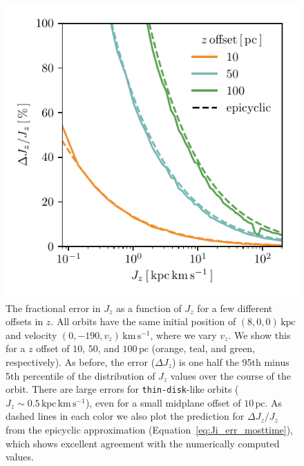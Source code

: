 \documentclass[twocolumn]{aastex62}
\newcommand{\pc}{\text{pc}}
\newcommand{\kpc}{\text{kpc}}
\newcommand{\kms}{\text{km}\,\text{s}^{-1}}
\newcommand{\actunit}{\text{kpc}\,\kms}
\newcommand{\thin}{\texttt{thin-disk}}
\begin{document}
\begin{figure}
\begin{center}
\includegraphics[width=\columnwidth]{fig/schmactions_many_orbits_Jz_fun.pdf}
\end{center}
\caption{The fractional error in $J_z$ as a function of $J_z$ for a few
different offsets in $z$. All orbits have the same initial position of $(8, 0,
0)\,\kpc$ and velocity $(0, -190, v_z)\,\kms$, where we vary $v_z$. We show
this for a $z$ offset of $10$, $50$, and $100\,\pc$ (orange, teal, and green,
respectively). As before, the error ($\Delta J_z$) is one half the 95th
minus 5th percentile of the distribution of $J_z$ values over the
course of the orbit. There are large errors for \thin{}-like orbits ($J_z
\sim 0.5\,\actunit$), even for a small midplane offset of $10\,\pc$. As dashed
lines in each color we also plot the prediction for $\Delta J_z/J_z$ from the
epicyclic approximation (Equation~\eqref{eq:Ji_err_mosttime}), which shows
excellent agreement with the numerically computed values.}
\label{fig:dJz_fun_Jz}
\end{figure}
\end{document}

